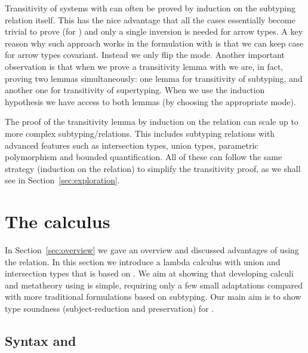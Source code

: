 Transitivity of systems with \nameduo can often be proved by induction
on the subtyping relation itself. This has the nice advantage that all the cases
essentially become trivial to prove (for \gstlc) and only a single inversion is needed for arrow types.
A key reason why such approach
works in the formulation with \nameduo is that we can keep case for arrow types covariant.
Instead we only flip the mode. Another important observation is that when
we prove a transitivity lemma with \nameduo we are, in fact, proving two lemmas
simultaneously: one lemma for transitivity of subtyping, and another one for transitivity
of supertyping. When we use the induction hypothesis we have access to both lemmas
(by choosing the appropriate mode).

The proof of the transitivity lemma by induction on the 
\nameduo relation can scale up to more complex subtyping/\nameduo relations. This includes 
subtyping relations with advanced features such as 
intersection types, union types, parametric polymorphism and bounded quantification.
All of these 
can follow the same strategy (induction on the \nameduo relation) to
simplify the transitivity proof, as we shall see in Section~\ref{sec:exploration}.






\section{The \ui calculus}
\label{sec:algorithm}

In Section~\ref{sec:overview} we gave an overview and discussed advantages of using the \nameduo relation.
In this section we introduce a lambda calculus with union and intersection types that is based
on \nameduo. We aim at showing that developing calculi and metatheory using \nameduo is
simple, requiring only a few small adaptations compared with more traditional formulations
based on subtyping. Our main aim is to show type soundness (subject-reduction and preservation)
for \ui.

\subsection{Syntax and \nameduo}
\label{sec:algorithm:1}

